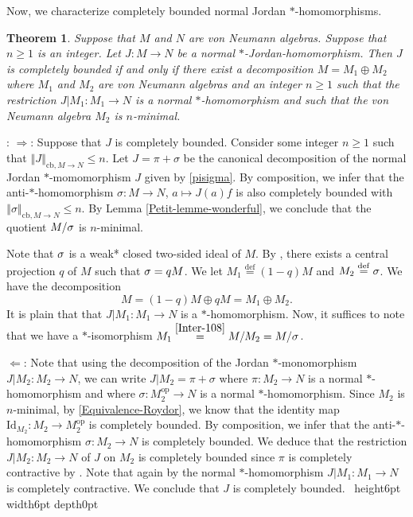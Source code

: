 \documentclass[leqno]{article} %
\renewcommand{\leq}{\ensuremath{\leqslant}}
\renewcommand{\geq}{\ensuremath{\geqslant}}
\newcommand{\qed}{\hfill \vrule height6pt  width6pt depth0pt}
\newcommand{\norm}[1]{\left\Vert#1\right\Vert}
\newcommand{\co}{\colon}
\newcommand{\ov}{\overset}
\newcommand{\Id}{\mathrm{Id}} %
\newcommand{\op}{\mathrm{op}} %
\let\ker\relax %
\DeclareMathOperator{\ker}{Ker} %
\newcommand{\cb}{\mathrm{cb}} %
\newtheorem{thm}{Theorem}[section]
\newenvironment{proof}[1][]{\noindent {\it Proof #1} : }{\hbox{~}\qed
\smallskip
}
\numberwithin{equation}{section}
\begin{document}
Now, we characterize completely bounded normal Jordan $*$-homomorphisms.

\begin{thm}
\label{Th-carac-jordan-homo}
Suppose that $M$ and $N$ are von Neumann algebras. Suppose that $n \geq 1$ is an integer. Let $J \co M \to N$ be a normal $*$-Jordan-homomorphism. Then $J$ is completely bounded if and only if there exist a decomposition $M=M_1 \oplus M_2$ where $M_1$ and $M_2$ are von Neumann algebras and an integer $n \geq 1$ such that the restriction $J|M_1 \co M_1 \to N$ is a normal $*$-homomorphism and such that the von Neumann algebra $M_2$ is $n$-minimal.
\end{thm}

\begin{proof}
$\Rightarrow$: Suppose that $J$ is completely bounded. Consider some integer $n \geq 1$ such that $\norm{J}_{\cb,M \to N} \leq n$. Let $J=\pi +\sigma$ be the canonical decomposition of the normal Jordan $*$-momomorphism $J$ given by \eqref{pisigma}. By composition, we infer that the anti-$*$-homomorphism $\sigma \co M \to N$, $a \mapsto J(a)f$ is also completely bounded with $\norm{\sigma}_{\cb,M \to N} \leq n$. By Lemma \ref{Petit-lemme-wonderful}, we conclude that the quotient $M/\ker \sigma$ is $n$-minimal.

Note that $\ker \sigma$ is a weak* closed two-sided ideal of $M$. By \cite[Theorem 6.8.8]{KaR2}, there exists a central projection $q$ of $M$ such that $\ker \sigma = qM$. We let $M_1 \ov{\mathrm{def}}{=} (1-q)M$ and $M_2 \ov{\mathrm{def}}{=} \ker \sigma $. We have the decomposition 
\begin{equation}
\label{Inter-108}
M
=(1-q)M \oplus qM
=M_1 \oplus M_2.
\end{equation} 
It is plain that that $J|M_1 \co M_1 \to N$ is a $*$-homomorphism. Now, it suffices to note that we have a $*$-isomorphism $M_1 \ov{\eqref{Inter-108}}{=} M/M_2=M/\ker \sigma$.


$\Leftarrow$: Note that using the decomposition of the Jordan $*$-monomorphism $J| M_2 \co M_2 \to N$, we can write $J|M_2=\pi+\sigma$ where $\pi \co M_2 \to N$ is a normal $*$-homomorphism and where $\sigma \co M_2^\op \to N$ is a normal $*$-homomorphism. Since $M_2$ is $n$-minimal, by \eqref{Equivalence-Roydor}, we know that the identity map $\Id_{M_2} \co M_2 \to M_2^\op$ is completely bounded. By composition, we infer that the anti-$*$-homomorphism $\sigma \co M_2 \to N$ is completely bounded. We deduce that the restriction $J| M_2 \co M_2 \to N$ of $J$ on $M_2$ is completely bounded since $\pi$ is completely contractive by \cite[Proposition 1.2.4]{BLM1}. Note that again by \cite[Proposition 1.2.4]{BLM1} the normal $*$-homomorphism $J|M_1 \co M_1 \to N$ is completely contractive. We conclude that $J$ is completely bounded.
\end{proof}
\end{document}
